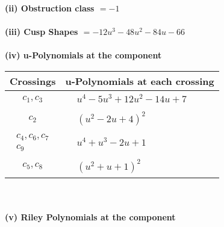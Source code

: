 \documentclass[1p]{elsarticle_modified}
\theoremstyle{definition}
\begin{document}
\flushleft \textbf{(ii) Obstruction class $= -1$}\\~\\
\flushleft \textbf{(iii) Cusp Shapes $= -12 u^3-48 u^2-84 u-66$}\\~\\
\newpage\renewcommand{\arraystretch}{1}
\flushleft \textbf{(iv) u-Polynomials at the component}\newline \\
\begin{tabular}{m{50pt}|m{274pt}}
Crossings & \hspace{64pt}u-Polynomials at each crossing \\
\hline $$\begin{aligned}c_{1},c_{3}\end{aligned}$$&$\begin{aligned}
&u^4-5 u^3+12 u^2-14 u+7
\end{aligned}$\\
\hline $$\begin{aligned}c_{2}\end{aligned}$$&$\begin{aligned}
&(u^2-2 u+4)^2
\end{aligned}$\\
\hline $$\begin{aligned}c_{4},c_{6},c_{7}\\c_{9}\end{aligned}$$&$\begin{aligned}
&u^4+u^3-2 u+1
\end{aligned}$\\
\hline $$\begin{aligned}c_{5},c_{8}\end{aligned}$$&$\begin{aligned}
&(u^2+u+1)^2
\end{aligned}$\\
\hline
\end{tabular}\\~\\
\newpage\renewcommand{\arraystretch}{1}
\flushleft \textbf{(v) Riley Polynomials at the component}\newline \\
\end{document}
